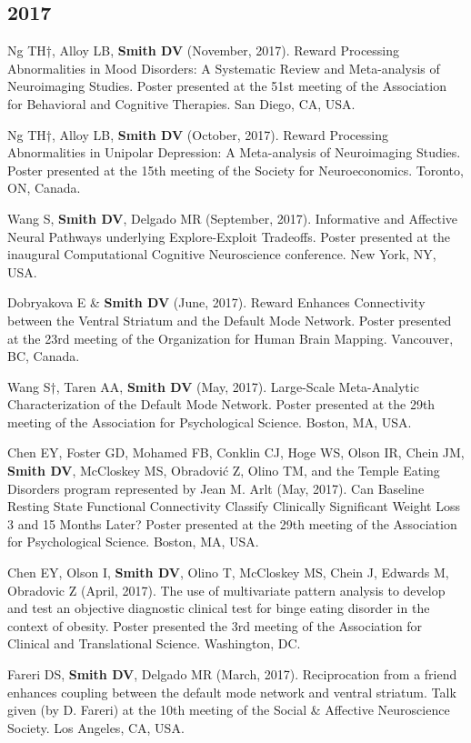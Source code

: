 \documentclass[11pt, letterpaper]{article}
\begin{document}
\subsection*{2017}
\begin{hangparas}{.5in}{1}
Ng TH†, Alloy LB, \textbf{Smith DV} (November, 2017). Reward Processing Abnormalities in Mood Disorders: A Systematic Review and Meta-analysis of Neuroimaging Studies. Poster presented at the 51st meeting of the Association for Behavioral and Cognitive Therapies. San Diego, CA, USA.

Ng TH†, Alloy LB, \textbf{Smith DV} (October, 2017). Reward Processing Abnormalities in Unipolar Depression: A Meta-analysis of Neuroimaging Studies. Poster presented at the 15th meeting of the Society for Neuroeconomics. Toronto, ON, Canada.

Wang S, \textbf{Smith DV}, Delgado MR (September, 2017). Informative and Affective Neural Pathways underlying Explore-Exploit Tradeoffs. Poster presented at the inaugural Computational Cognitive Neuroscience conference. New York, NY, USA.

Dobryakova E \& \textbf{Smith DV} (June, 2017). Reward Enhances Connectivity between the Ventral Striatum and the Default Mode Network. Poster presented at the 23rd meeting of the Organization for Human Brain Mapping. Vancouver, BC, Canada.

Wang  S†, Taren AA, \textbf{Smith DV} (May, 2017). Large-Scale Meta-Analytic Characterization of the Default Mode Network. Poster presented at the 29th meeting of the Association for Psychological Science. Boston, MA, USA.

Chen EY, Foster GD, Mohamed FB, Conklin CJ, Hoge WS, Olson IR, Chein JM, \textbf{Smith DV}, McCloskey MS, Obradović Z, Olino TM, and the Temple Eating Disorders program represented by Jean M. Arlt (May, 2017). Can Baseline Resting State Functional Connectivity Classify Clinically Significant Weight Loss 3 and 15 Months Later? Poster presented at the 29th meeting of the Association for Psychological Science. Boston, MA, USA.

Chen EY, Olson I, \textbf{Smith DV}, Olino T, McCloskey MS, Chein J, Edwards M, Obradovic Z  (April, 2017). The use of multivariate pattern analysis to develop and test an objective diagnostic clinical test for binge eating disorder in the context of obesity. Poster presented the 3rd meeting of the Association for Clinical and Translational Science. Washington, DC.

Fareri DS, \textbf{Smith DV}, Delgado MR (March, 2017). Reciprocation from a friend enhances coupling between the default mode network and ventral striatum. Talk given (by D. Fareri) at the 10th meeting of the Social \& Affective Neuroscience Society. Los Angeles, CA, USA. \\

\end{hangparas}
\end{document}
